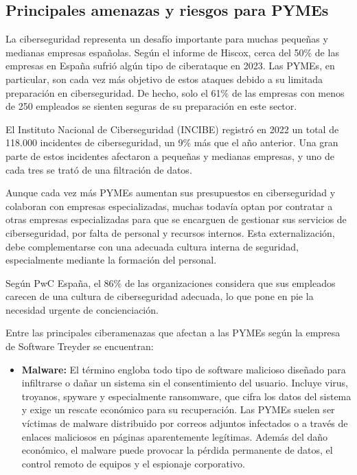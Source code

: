 \documentclass[a4paper, 10pt]{article}
\begin{document}
\subsection{Principales amenazas y riesgos para PYMEs}

La ciberseguridad representa un desafío importante para muchas pequeñas y medianas empresas españolas. Según el informe de Hiscox, cerca del 50\% de las empresas en España sufrió algún tipo de ciberataque en 2023. Las PYMEs, en particular, son cada vez más objetivo de estos ataques debido a su limitada preparación en ciberseguridad. De hecho, solo el 61\% de las empresas con menos de 250 empleados se sienten seguras de su preparación en este sector. \cite{hiscox}
\par\vspace{0.5cm}

El Instituto Nacional de Ciberseguridad (INCIBE) registró en 2022 un total de 118.000 incidentes de ciberseguridad, un 9\% más que el año anterior. Una gran parte de estos incidentes afectaron a pequeñas y medianas empresas, y uno de cada tres se trató de una filtración de datos.\cite{incibe2023}
\par\vspace{0.5cm}

Aunque cada vez más PYMEs aumentan sus presupuestos en ciberseguridad y colaboran con empresas especializadas, muchas todavía optan por contratar a otras empresas especializadas para que se encarguen de gestionar sus servicios de ciberseguridad, 
por falta de personal y recursos internos. Esta 
externalización, debe complementarse con una adecuada cultura interna de seguridad, especialmente mediante la formación del personal.
\par\vspace{0.5cm}

Según PwC España, el 86\% de las organizaciones considera que sus empleados carecen de una cultura de ciberseguridad adecuada, lo que pone en pie la necesidad urgente de concienciación.\cite{pow}
\par\vspace{0.5cm}

Entre las principales ciberamenazas que afectan a las PYMEs según la empresa de Software Treyder \cite{treider} se encuentran:

\begin{itemize}
    \item \textbf{Malware:}  
    El término engloba todo tipo de software malicioso diseñado para infiltrarse o dañar un sistema sin el consentimiento del usuario. Incluye virus, troyanos, spyware y especialmente ransomware, que cifra los datos del sistema y exige un rescate económico para su recuperación. Las PYMEs suelen ser víctimas de malware distribuido por correos adjuntos infectados o a través de enlaces maliciosos en páginas aparentemente legítimas. Además del daño económico, el malware puede provocar la pérdida permanente de datos, el control remoto de equipos y el espionaje corporativo.
\end{itemize}
\end{document}
